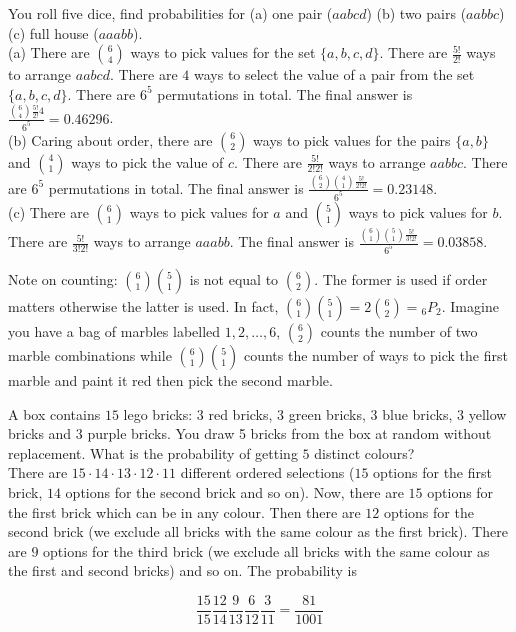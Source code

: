 \documentclass[12pt, a4paper]{article}
\newcounter{exa}
\begin{document}
\begin{texample}
You roll five dice, find probabilities for (a) one pair ($aabcd$) (b) two pairs ($aabbc$) (c) full house ($aaabb$). \\

(a) There are $\binom{6}{4}$ ways to pick values for the set $\{a, b, c, d\}$. There are $\frac{5!}{2!}$ ways to arrange $aabcd$. There are $4$ ways to select the value of a pair from the set $\{a, b, c, d\}$. There are $6^5$ permutations in total. The final answer is $\frac{\binom{6}{4}\frac{5!}{2!}4}{6^5}=0.46296$. \\

(b) Caring about order, there are $\binom{6}{2}$ ways to pick values for the pairs $\{a, b\}$ and $\binom{4}{1}$ ways to pick the value of $c$. There are $\frac{5!}{2!2!}$ ways to arrange $aabbc$. There are $6^5$ permutations in total. The final answer is $\frac{\binom{6}{2}\binom{4}{1}\frac{5!}{2!2!}}{6^5}=0.23148$. \\

(c) There are $\binom{6}{1}$ ways to pick values for $a$ and $\binom{5}{1}$ ways to pick values for $b$. There are $\frac{5!}{3!2!}$ ways to arrange $aaabb$. The final answer is $\frac{\binom{6}{1}\binom{5}{1}\frac{5!}{3!2!}}{6^5}=0.03858$.
\end{texample}

Note on counting: $\binom{6}{1}\binom{5}{1}$ is not equal to $\binom{6}{2}$. The former is used if order matters otherwise the latter is used. In fact, $\binom{6}{1}\binom{5}{1}=2\binom{6}{2}={}_6P_2$. Imagine you have a bag of marbles labelled $1, 2, \dots, 6$, $\binom{6}{2}$ counts the number of two marble combinations while $\binom{6}{1}\binom{5}{1}$ counts the number of ways to pick the first marble and paint it red then pick the second marble.

\begin{texample}
A box contains $15$ lego bricks: $3$ red bricks, $3$ green bricks, $3$ blue bricks, $3$ yellow bricks and $3$ purple bricks. You draw 5 bricks from the box at random without replacement. What is the probability of getting $5$ distinct colours? \\

There are $15\cdot14\cdot13\cdot12\cdot11$ different ordered selections ($15$ options for the first brick, $14$ options for the second brick and so on). Now, there are $15$ options for the first brick which can be in any colour. Then there are $12$ options for the second brick (we exclude all bricks with the same colour as the first brick). There are $9$ options for the third brick (we exclude all bricks with the same colour as the first and second bricks) and so on. The probability is

\[\frac{15}{15}\frac{12}{14}\frac{9}{13}\frac{6}{12}\frac{3}{11}=\frac{81}{1001}\]
\end{texample}
\end{document}
